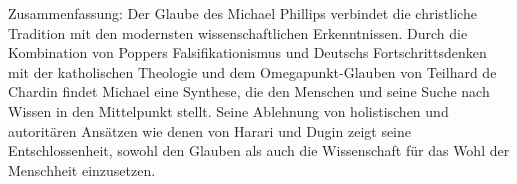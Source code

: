 \documentclass[
]{article}
\begin{document}
Zusammenfassung: Der Glaube des Michael Phillips verbindet die
christliche Tradition mit den modernsten wissenschaftlichen
Erkenntnissen. Durch die Kombination von Poppers Falsifikationismus und
Deutschs Fortschrittsdenken mit der katholischen Theologie und dem
Omegapunkt-Glauben von Teilhard de Chardin findet Michael eine Synthese,
die den Menschen und seine Suche nach Wissen in den Mittelpunkt stellt.
Seine Ablehnung von holistischen und autoritären Ansätzen wie denen von
Harari und Dugin zeigt seine Entschlossenheit, sowohl den Glauben als
auch die Wissenschaft für das Wohl der Menschheit einzusetzen.
\end{document}
